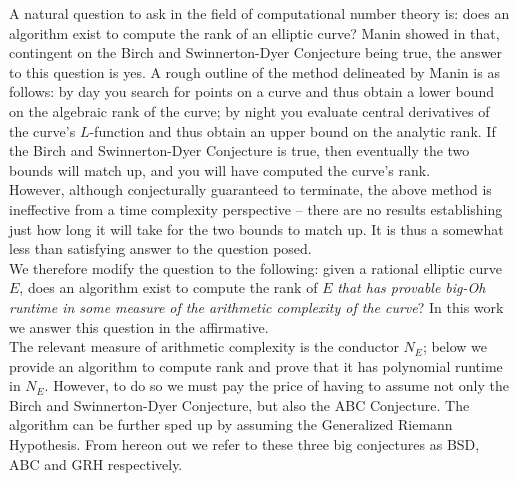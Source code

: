 
A natural question to ask in the field of computational number theory is: does an algorithm exist to compute the rank of an elliptic curve? Manin showed in \cite{Man-1971} that, contingent on the Birch and Swinnerton-Dyer Conjecture being true, the answer to this question is yes. A rough outline of the method delineated by Manin is as follows: by day you search for points on a curve and thus obtain a lower bound on the algebraic rank of the curve; by night you evaluate central derivatives of the curve's $L$-function and thus obtain an upper bound on the analytic rank. If the Birch and Swinnerton-Dyer Conjecture is true, then eventually the two bounds will match up, and you will have computed the curve's rank. \\

However, although conjecturally guaranteed to terminate, the above method is ineffective from a time complexity perspective -- there are no results establishing just how long it will take for the two bounds to match up. It is thus a somewhat less than satisfying answer to the question posed. \\

We therefore modify the question to the following: given a rational elliptic curve $E$, does an algorithm exist to compute the rank of $E$ {\it that has provable big-Oh runtime in some measure of the arithmetic complexity of the curve}? In this work we answer this question in the affirmative. \\

The relevant measure of arithmetic complexity is the conductor $N_E$; below we provide an algorithm to compute rank and prove that it has polynomial runtime in $N_E$. However, to do so we must pay the price of having to assume not only the Birch and Swinnerton-Dyer Conjecture, but also the ABC Conjecture. The algorithm can be further sped up by assuming the Generalized Riemann Hypothesis. From hereon out we refer to these three big conjectures as BSD, ABC and GRH respectively. \\

